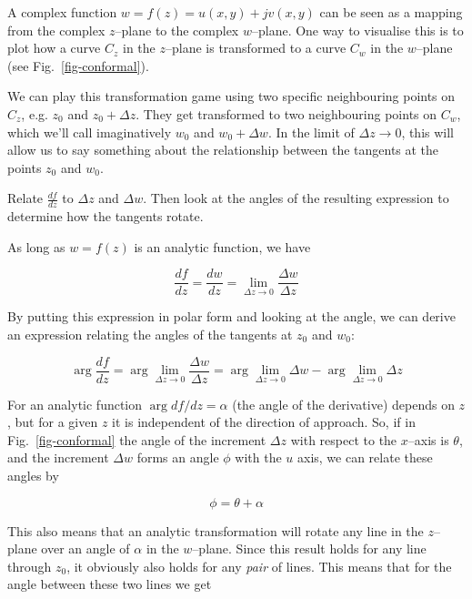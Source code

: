 A complex function $w = f(z) = u(x,y)+jv(x,y)$ can be seen as a mapping from the complex $z$--plane to the complex $w$--plane. One way to visualise this is to plot how a curve $C_z$ in the $z$--plane is transformed to a curve $C_w$ in the $w$--plane (see Fig.~\ref{fig-conformal}).

We can play this transformation game using two specific neighbouring points on $C_z$, e.g. $z_0$ and $z_0+\Delta z$. They get transformed to two neighbouring points on $C_w$, which we'll call imaginatively $w_0$ and $w_0+\Delta w$. In the limit of $\Delta z \to 0$, this will allow us to say something about the relationship between the tangents at the points $z_0$ and $w_0$.

\begin{cue}
Relate $\frac{df}{dz}$ to $\Delta z$ and $\Delta w$. Then look at the angles of the resulting expression to determine how the tangents rotate.
\end{cue}

As long as $w=f(z)$ is an analytic function, we have

\begin{equation}
\frac{df}{dz} = \frac{dw}{dz} = \lim_{\Delta z \to 0} \frac{\Delta w}{\Delta z}
\end{equation}

By putting this expression in polar form and looking at the angle, we can derive an expression relating the angles of the tangents at $z_0$ and $w_0$:

\begin{equation}
\arg \frac{df}{dz} = \arg \lim_{\Delta z \to 0} \frac{\Delta w}{\Delta z} = \arg
\lim_{\Delta z   \to 0} \Delta w - \arg \lim_{\Delta z \to 0} \Delta z
\end{equation} 

For an analytic function $\arg df / dz = \alpha$ (the angle of the derivative) depends on $z$, but for a given $z$ it is independent of the direction of approach. So, if in Fig.~\ref{fig-conformal} the angle of the increment $\Delta z$ with respect to the $x$--axis is $\theta$, and the increment $\Delta w$ forms an angle $\phi$ with the $u$ axis, we can relate these angles by

\begin{equation}
\phi = \theta + \alpha
\end{equation}

This also means that an analytic transformation will rotate any line in the $z$--plane over an angle of $\alpha$ in the $w$--plane. Since this result holds for any line through $z_0$, it obviously also holds for any \emph{pair} of lines. This means that for the angle between these two lines we get

